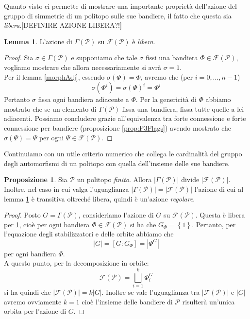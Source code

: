 \documentclass[a4paper,12pt]{report}
\newcommand{\p}{\mathcal{P}}
\theoremstyle{plain}
\theoremstyle{definition}
\newtheorem{lem}[teo]{Lemma}
\newtheorem{prop}[teo]{Proposizione}
\begin{document}
Quanto visto ci permette di mostrare una importante propriet\`a dell'azione del gruppo di simmetrie di un politopo sulle sue bandiere, il fatto
che questa sia \emph{libera}.[DEFINIRE AZIONE LIBERA?!]
\begin{lem}
\label{freeAction}
L'azione di $\Gamma(\p)$ su $\mathcal{F}(\p)$ \`e \emph{libera}.
\end{lem}
\begin{proof}
Sia $\sigma\in\Gamma(\p)$ e supponiamo che tale $\sigma$ fissi una bandiera $\Phi\in\mathcal{F}(\p)$, vogliamo mostrare che allora necessariamente
si avr\`a $\sigma=1$.\\
Per il lemma \ref{morphAdj}, essendo $\sigma(\Phi)=\Phi$, avremo che (per $i=0,\dots,n-1$)
\begin{equation*}
\sigma(\Phi^i)=\sigma(\Phi)^i=\Phi^i
\end{equation*}
Pertanto $\sigma$ fissa ogni bandiera adiacente a $\Phi$. Per la genericit\`a di $\Phi$ abbiamo mostrato che se un elemento di $\Gamma(\p)$ fissa una
bandiera, fissa tutte quelle a lei adiacenti. Possiamo concludere grazie all'equivalenza tra forte connessione e forte connessione per bandiere
(proposizione \ref{prop:P3Flags}) avendo mostrato che $\sigma(\Psi)=\Psi$ per ogni $\Psi\in\mathcal{F}(\p)$.
\end{proof}
Continuiamo con un utile criterio numerico che collega le cardinalit\`a del gruppo degli automorfismi di un politopo con quella dell'insieme delle sue
bandiere.
\begin{prop}
\label{regularAction}
Sia $\p$ un politopo \emph{finito}. Allora $\left|\Gamma(\p)\right|$ divide $\left|\mathcal{F}(\p)\right|$. Inoltre, nel caso in cui valga l'uguaglianza
$\left|\Gamma(\p)\right|=\left|\mathcal{F}(\p)\right|$ l'azione di cui al lemma \ref{freeAction} \`e transitiva oltrech\'e libera, quindi 
\`e un'azione \emph{regolare}.
\end{prop}
\begin{proof}
Posto $G=\Gamma(\p)$, consideriamo l'azione di $G$ su $\mathcal{F}(\p)$. Questa \`e libera per \ref{freeAction}, cio\`e per ogni bandiera
$\Phi\in\mathcal{F}(\p)$ si ha che $G_\Phi=\left\{1\right\}$. Pertanto, per l'equazione degli stabilizzatori e delle orbite abbiamo che
\begin{equation*}
\left|G\right|=[G:G_\Phi]=\left|\Phi^G\right|
\end{equation*}
per ogni bandiera $\Phi$.\\
A questo punto, per la decomposizione in orbite:
\begin{equation*}
\mathcal{F}(\p)=\bigsqcup_{i=1}^k \Phi_i^G
\end{equation*}
si ha quindi che $\left|\mathcal{F}(\p)\right|=k\left|G\right|$. Inoltre se vale l'uguaglianza tra $\left|\mathcal{F}(\p)\right|$ e $\left|G\right|$
avremo ovviamente $k=1$ cio\`e l'insieme delle bandiere di $\p$ risulter\`a un'unica orbita per l'azione di $G$.
\end{proof}
\end{document}
